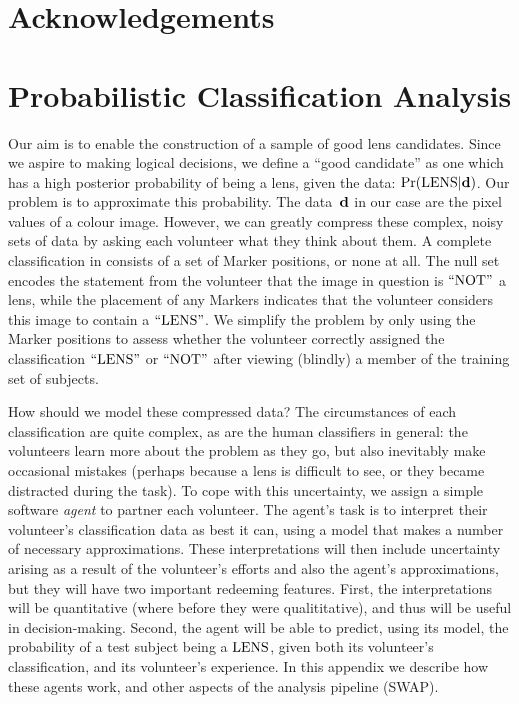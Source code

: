\documentclass[useAMS,usenatbib,a4paper]{mn2e}
\begin{document}
\section*{Acknowledgements}
 



\appendix


\section{Probabilistic Classification Analysis}
\label{appendix:swap}

Our aim is to enable the construction of a sample of good lens candidates.
Since we aspire to making logical  decisions, we define a  ``good candidate''
as one which has a high posterior probability of being a lens, given the data:
${\rm Pr}({\rm LENS}|{\mathbf{d}})$. Our problem is to approximate this probability. The data~${\mathbf{d}}$
in our case are the pixel values of a colour image. However, we can greatly
compress these complex, noisy sets of data by asking each volunteer what they
think about them. A complete  classification in \sw consists of a set of
Marker positions, or none at all. The null set encodes the statement from
the volunteer that the image in question is ${\rm ``NOT"}$ a lens, while the
placement of any  Markers indicates that the volunteer considers this image to
contain a ${\rm ``LENS"}$.  We simplify the problem by only using the Marker
positions to assess whether the volunteer  correctly assigned the
classification ${\rm ``LENS"}$ or ${\rm ``NOT"}$ after viewing (blindly) a member of
the training set of subjects. 

How should we model these compressed data? The circumstances of each
classification are quite complex, as are the human classifiers in general: the
volunteers learn more about the problem as they go, but also inevitably make
occasional mistakes (perhaps because a lens is difficult to see, or they
became distracted during the task). To cope with this uncertainty, we assign a
simple software {\it agent} to partner each volunteer. The agent's task is to
interpret their volunteer's classification data as best it can, using a model
that makes a number of necessary approximations. These interpretations will
then include uncertainty arising as a result of the volunteer's efforts and
also the agent's approximations, but they will have two important redeeming
features. First, the interpretations will be quantitative (where before they
were qualititative),  and thus will be useful in decision-making. Second, the
agent will be able to predict, using its model, the probability of a test
subject being a ${\rm LENS}$, given both its volunteer's classification, and its
volunteer's experience. In this appendix we describe how these agents work,
and other aspects of the \sw analysis pipeline (SWAP).
\end{document}
